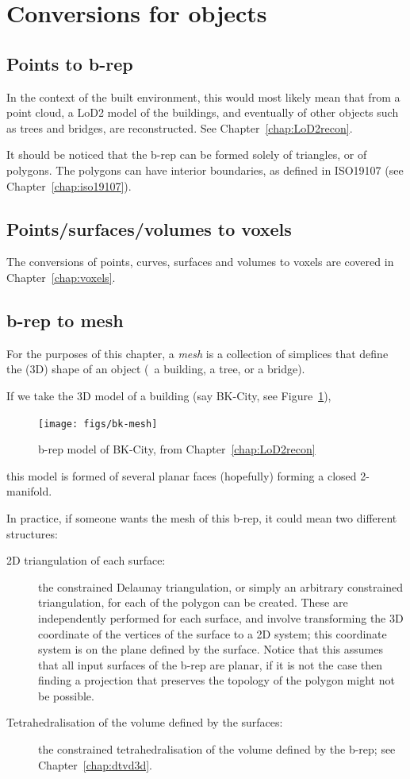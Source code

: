 %
\section{Conversions for objects}


\subsection{Points to b-rep}

In the context of the built environment, this would most likely mean that from a point cloud, a LoD2 model of the buildings, and eventually of other objects such as trees and bridges, are reconstructed. See Chapter~\ref{chap:LoD2recon}.

It should be noticed that the b-rep can be formed solely of triangles, or of polygons.
The polygons can have interior boundaries, as defined in ISO19107 (see Chapter~\ref{chap:iso19107}).

\subsection{Points/surfaces/volumes to voxels}

The conversions of points, curves, surfaces and volumes to voxels are covered in Chapter~\ref{chap:voxels}.


\subsection{b-rep to mesh}

For the purposes of this chapter, a \emph{mesh} is a collection of simplices that define the (3D) shape of an object (\eg\ a building, a tree, or a bridge).

If we take the 3D model of a building (say BK-City, see Figure~\ref{fig:bk-mesh}), 
\begin{figure}
  \centering
  \texttt{[image: figs/bk-mesh]}
  \caption{b-rep model of BK-City, from Chapter~\ref{chap:LoD2recon}}%
\label{fig:bk-mesh}
\end{figure}
this model is formed of several planar faces (hopefully) forming a closed 2-manifold.

In practice, if someone wants the mesh of this b-rep, it could mean two different structures:
\begin{description}
  \item[2D triangulation of each surface:] the constrained Delaunay triangulation, or simply an arbitrary constrained triangulation, for each of the polygon can be created. These are independently performed for each surface, and involve transforming the 3D coordinate of the vertices of the surface to a 2D system; this coordinate system is on the plane defined by the surface. Notice that this assumes that all input surfaces of the b-rep are planar, if it is not the case then finding a projection that preserves the topology of the polygon might not be possible.
  \item[Tetrahedralisation of the volume defined by the surfaces:] the constrained tetrahedralisation of the volume defined by the b-rep; see Chapter~\ref{chap:dtvd3d}.
\end{description}

